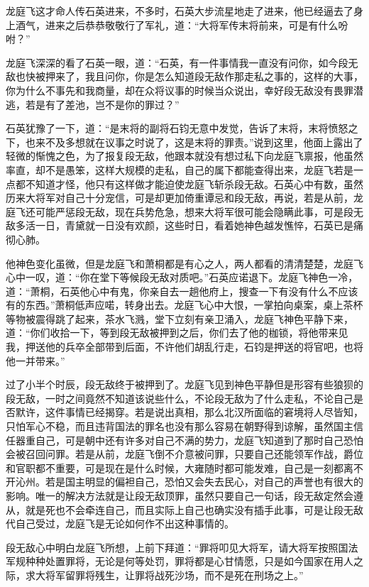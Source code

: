 龙庭飞这才命人传石英进来，不多时，石英大步流星地走了进来，他已经逼去了身上酒气，进来之后恭恭敬敬行了军礼，道：“大将军传末将前来，可是有什么吩咐？”

龙庭飞深深的看了石英一眼，道：“石英，有一件事情我一直没有问你，如今段无敌也快被押来了，我且问你，你是怎么知道段无敌作那走私之事的，这样的大事，你为什么不事先和我商量，却在众将议事的时候当众说出，幸好段无敌没有畏罪潜逃，若是有了差池，岂不是你的罪过？”

石英犹豫了一下，道：“是末将的副将石钧无意中发觉，告诉了末将，末将愤怒之下，也来不及多想就在议事之时说了，这是末将的罪责。”说到这里，他面上露出了轻微的惭愧之色，为了报复段无敌，他跟本就没有想过私下向龙庭飞禀报，他虽然率直，却不是愚笨，这样大规模的走私，自己的属下都能查得出来，龙庭飞若是一点都不知道才怪，他只有这样做才能迫使龙庭飞斩杀段无敌。石英心中有数，虽然历来大将军对自己十分宠信，可是却更加倚重谭忌和段无敌，再说，若是从前，龙庭飞还可能严惩段无敌，现在兵势危急，想来大将军很可能会隐瞒此事，可是段无敌多活一日，青黛就一日没有欢颜，这些时日，看着她神色越发憔悴，石英已是痛彻心肺。

他神色变化虽微，但是龙庭飞和萧桐都是有心之人，两人都看的清清楚楚，龙庭飞心中一叹，道：“你在堂下等候段无敌对质吧。”石英应诺退下。龙庭飞神色一冷，道：“萧桐，石英他心中有鬼，你亲自去一趟他府上，搜查一下有没有什么不应该有的东西。”萧桐低声应喏，转身出去。龙庭飞心中大恨，一掌拍向桌案，桌上茶杯等物被震得跳了起来，茶水飞溅，堂下立刻有亲卫涌入，龙庭飞神色平静下来，道：“你们收拾一下，等到段无敌被押到之后，你们去了他的枷锁，将他带来见我，押送他的兵卒全部带到后面，不许他们胡乱行走，石钧是押送的将官吧，也将他一并带来。”

过了小半个时辰，段无敌终于被押到了。龙庭飞见到神色平静但是形容有些狼狈的段无敌，一时之间竟然不知道该说些什么，不论段无敌为了什么走私，不论自己是否默许，这件事情已经揭穿。若是说出真相，那么北汉所面临的窘境将人尽皆知，只怕军心不稳，而且违背国法的罪名也没有那么容易在朝野得到谅解，虽然国主信任器重自己，可是朝中还有许多对自己不满的势力，龙庭飞知道到了那时自己恐怕会被召回问罪。若是从前，龙庭飞倒不介意被问罪，只要自己还能领军作战，爵位和官职都不重要，可是现在是什么时候，大雍随时都可能发难，自己是一刻都离不开沁州。若是国主明显的偏袒自己，恐怕又会失去民心，对自己的声誉也有很大的影响。唯一的解决方法就是让段无敌顶罪，虽然只要自己一句话，段无敌定然会遵从，就是死也不会牵连自己，而且实际上自己也确实没有插手此事，可是让段无敌代自己受过，龙庭飞是无论如何作不出这种事情的。

段无敌心中明白龙庭飞所想，上前下拜道：“罪将叩见大将军，请大将军按照国法军规种种处置罪将，无论是何等处罚，罪将都是心甘情愿，只是如今国家在用人之际，求大将军留罪将残生，让罪将战死沙场，而不是死在刑场之上。”

